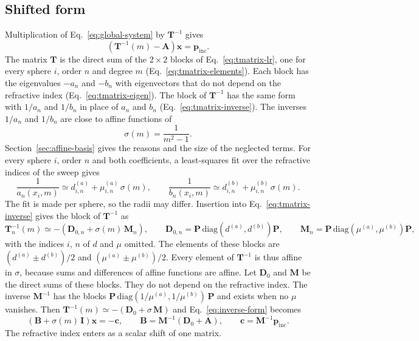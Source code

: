 \documentclass[11pt,a4paper]{article}
\begin{document}
\subsection{Shifted form}
Multiplication of Eq.~\eqref{eq:global-system} by $\mathbf{T}^{-1}$ gives
\begin{equation}
  \left(\mathbf{T}^{-1}(m) - \mathbf{A}\right)\bm{x} = \bm{p}_\mathrm{inc}.
  \label{eq:inverse-form}
\end{equation}
The matrix $\mathbf{T}$ is the direct sum of the $2 \times 2$ blocks of Eq.~\eqref{eq:tmatrix-lr}, one for every sphere $i$, order $n$ and degree $m$ (Eq.~\eqref{eq:tmatrix-elements}).
Each block has the eigenvalues $-a_n$ and $-b_n$ with eigenvectors that do not depend on the refractive index (Eq.~\eqref{eq:tmatrix-eigen}).
The block of $\mathbf{T}^{-1}$ has the same form with $1/a_n$ and $1/b_n$ in place of $a_n$ and $b_n$ (Eq.~\eqref{eq:tmatrix-inverse}).
The inverses $1/a_n$ and $1/b_n$ are close to affine functions of
\begin{equation}
  \sigma(m) = \frac{1}{m^2 - 1}.
  \label{eq:shift-function}
\end{equation}
Section~\ref{sec:affine-basis} gives the reasons and the size of the neglected terms.
For every sphere $i$, order $n$ and both coefficients, a least-squares fit over the refractive indices of the sweep gives
\begin{equation}
  \frac{1}{a_n(x_i, m)} \simeq d^{(a)}_{i,n} + \mu^{(a)}_{i,n}\,\sigma(m), \qquad
  \frac{1}{b_n(x_i, m)} \simeq d^{(b)}_{i,n} + \mu^{(b)}_{i,n}\,\sigma(m).
  \label{eq:affine-fit}
\end{equation}
The fit is made per sphere, so the radii may differ.
Insertion into Eq.~\eqref{eq:tmatrix-inverse} gives the block of $\mathbf{T}^{-1}$ as
\begin{equation}
  \mathbf{T}_n^{-1}(m) \simeq -\left(\mathbf{D}_{0,n} + \sigma(m)\,\mathbf{M}_n\right), \qquad
  \mathbf{D}_{0,n} = \mathbf{P}\,\mathrm{diag}\!\left(d^{(a)}, d^{(b)}\right)\mathbf{P}, \qquad
  \mathbf{M}_n = \mathbf{P}\,\mathrm{diag}\!\left(\mu^{(a)}, \mu^{(b)}\right)\mathbf{P},
  \label{eq:inverse-blocks}
\end{equation}
with the indices $i$, $n$ of $d$ and $\mu$ omitted.
The elements of these blocks are $(d^{(a)} \pm d^{(b)})/2$ and $(\mu^{(a)} \pm \mu^{(b)})/2$.
Every element of $\mathbf{T}^{-1}$ is thus affine in $\sigma$, because sums and differences of affine functions are affine.
Let $\mathbf{D}_0$ and $\mathbf{M}$ be the direct sums of these blocks. They do not depend on the refractive index.
The inverse $\mathbf{M}^{-1}$ has the blocks $\mathbf{P}\,\mathrm{diag}(1/\mu^{(a)}, 1/\mu^{(b)})\,\mathbf{P}$ and exists when no $\mu$ vanishes.
Then $\mathbf{T}^{-1}(m) \simeq -(\mathbf{D}_0 + \sigma\,\mathbf{M})$ and Eq.~\eqref{eq:inverse-form} becomes
\begin{equation}
  \left(\mathbf{B} + \sigma(m)\,\mathbf{I}\right)\bm{x} = -\bm{c}, \qquad
  \mathbf{B} = \mathbf{M}^{-1}\left(\mathbf{D}_0 + \mathbf{A}\right), \qquad
  \bm{c} = \mathbf{M}^{-1}\bm{p}_\mathrm{inc}.
  \label{eq:shifted-system}
\end{equation}
The refractive index enters as a scalar shift of one matrix.
\end{document}
